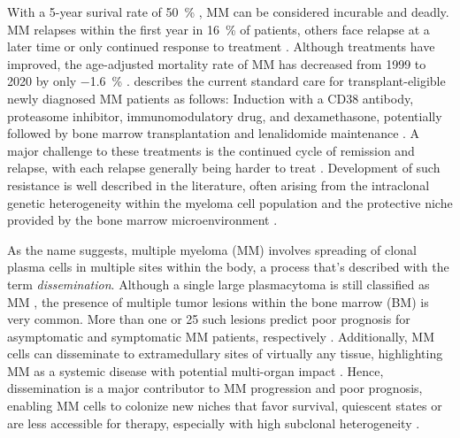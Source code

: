 With a 5-year surival rate of \SI{50}{\percent}
\cite{turessonRapidlyChangingMyeloma2018}, MM can be considered incurable and
deadly. MM relapses within the first year in \SI{16}{\percent} of patients,
others face relapse at a later time or only continued response to treatment
\cite{majithiaEarlyRelapseFollowing2016}. Although treatments have improved, the
age-adjusted mortality rate of MM has decreased from 1999 to 2020 by only
\SI{-1.6}{\percent} \cite{doddiDisparitiesMultipleMyeloma2024}.
\citet{engelhardtFunctionalCureLongterm2024} describes the current standard care
for transplant-eligible newly diagnosed MM patients as follows: Induction with a
CD38 antibody, proteasome inhibitor, immunomodulatory drug, and dexamethasone,
potentially followed by bone marrow transplantation and lenalidomide maintenance
\cite{rajkumarMultipleMyelomaCurrent2020}. A major challenge to these treatments
is the continued cycle of remission and relapse, with each relapse generally
being harder to treat \cite{podarRelapsedRefractoryMultiple2021}. Development of
such resistance is well described in the literature, often arising from the
intraclonal genetic heterogeneity within the myeloma cell population and the
protective niche provided by the bone marrow microenvironment
\cite{solimandoDrugResistanceMultiple2022}.



%
\label{sec:intro_myeloma_dissemination}%
As the name suggests, multiple myeloma (MM) involves spreading of clonal plasma
cells in multiple sites within the body, a process that's described with the
term \emph{dissemination}. Although a single large plasmacytoma is still
classified as MM \cite{rajkumarInternationalMyelomaWorking2014}, the presence of
multiple tumor lesions within the bone marrow (BM) is very common. More than one
or 25 such lesions predict poor prognosis for asymptomatic and symptomatic MM
patients, respectively \cite{kastritisPrognosticImportancePresence2014,
    maiMagneticResonanceImagingbased2015a}. Additionally, MM cells can disseminate
to extramedullary sites of virtually any tissue, highlighting MM as a systemic
disease with potential multi-organ impact
\cite{rajkumarMultipleMyelomaCurrent2020,
    bladeExtramedullaryDiseaseMultiple2022}. Hence, dissemination is a major
contributor to MM progression and poor prognosis, enabling MM cells to colonize
new niches that favor survival, quiescent states or are less accessible for
therapy, especially with high subclonal heterogeneity
\cite{forsterMolecularImpactTumor2022,keatsClonalCompetitionAlternating2012}.

